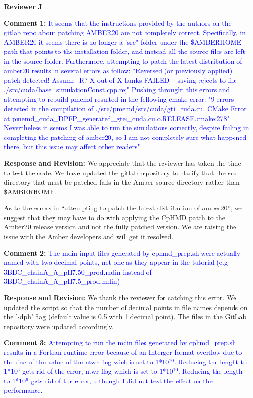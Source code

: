 \documentclass[11pt,letterpaper]{businessletter}
\begin{document}
\begin{letter}
\bigskip

{\large \bf Reviewer J}

\textbf{Comment 1:}
\textcolor{Blue}{
It seems that the instructions provided by the authors on the gitlab repo about patching AMBER20 are not completely correct.
Specifically, in AMBER20 it seems there is no longer a "src" folder under the \$AMBERHOME path that points to the installation folder, and instead all the source files are left in the source folder. Furthermore, attempting to patch the latest distribution of amber20 results in several errors as follow:
"Reversed (or previously applied) patch detected! Assume -R?
X out of X hunks FAILED -- saving rejects to file ./src/cuda/base\_simulationConst.cpp.rej" Pushing throught this errors and attempting to rebuild pmemd resulted in the following cmake error:
"9 errors detected in the compilation of ./src/pmemd/src/cuda/gti\_cuda.cu.
CMake Error at pmemd\_cuda\_DPFP\_generated\_gtei\_cuda.cu.o.RELEASE.cmake:278" Nevertheless it seems I was able to run the simulations correctly, despite failing in completing the patching of amber20, so I am not completely sure what happened there, but this issue may affect other readers"
}

\textbf{Response and Revision:} 
We appreciate that the reviewer has taken the time to test the code.
We have updated the gitlab repository to clarify that the src directory that must be patched falls in the Amber source directory rather than \$AMBERHOME.

As to the errors in ``attempting to patch the latest distribution of amber20'', we suggest that they may have to do with applying the CpHMD patch to the Amber20 release version and not the fully patched version. 
We are raising the issue with the Amber developers and will get it resolved. 


\textbf{Comment 2:}
\textcolor{Blue}{
The mdin input files generated by cphmd\_prep.sh were actually named with two decimal points, not one as they appear in the tutorial (e.g 3BDC\_chainA\_A\_pH7.50\_prod.mdin instead of 3BDC\_chainA\_A\_pH7.5\_prod.mdin)
}

\textbf{Response and Revision:} 
We thank the reviewer for catching this error.
We updated the script so that the number of decimal 
points in file names depends on the
'-dph' flag (default value is 0.5 with 1 decimal point). 
The files in the GitLab repository were updated accordingly.

\textbf{Comment 3:}
\textcolor{Blue}{
Attempting to run the mdin files generated by cphmd\_prep.sh results in a Fortran runtime error because of an Interger format overflow due to the size of the value of the ntwr flag wich is set to 1*10$^{10}$. Reducing the lenght to 1*10$^6$ gets rid of the error,
ntwr flag which is set to 1*10$^{10}$. Reducing the length to 1*10$^6$ gets rid of the error, although I did not test the effect on the performance.
}


\end{letter}
\end{document}
